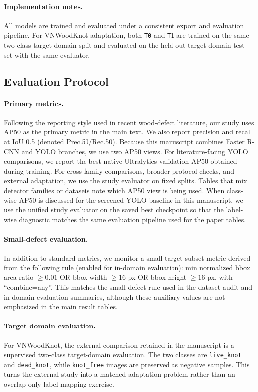 \paragraph{Implementation notes.}
All models are trained and evaluated under a consistent export and evaluation pipeline. For VNWoodKnot adaptation, both \texttt{T0} and \texttt{T1} are trained on the same two-class target-domain split and evaluated on the held-out target-domain test set with the same evaluator.

\subsection{Evaluation Protocol}
\label{sec:eval}

\paragraph{Primary metrics.}
Following the reporting style used in recent wood-defect literature, our study uses AP50 as the primary metric in the main text. We also report precision and recall at IoU 0.5 (denoted Prec.50/Rec.50). Because this manuscript combines Faster R-CNN and YOLO branches, we use two AP50 views. For literature-facing YOLO comparisons, we report the best native Ultralytics validation AP50 obtained during training. For cross-family comparisons, broader-protocol checks, and external adaptation, we use the study evaluator on fixed splits. Tables that mix detector families or datasets note which AP50 view is being used.
When class-wise AP50 is discussed for the screened YOLO baseline in this manuscript, we use the unified study evaluator on the saved best checkpoint so that the label-wise diagnostic matches the same evaluation pipeline used for the paper tables.

\paragraph{Small-defect evaluation.}
In addition to standard metrics, we monitor a small-target subset metric derived from the following rule (enabled for in-domain evaluation):
min normalized bbox area ratio $\ge 0.01$ OR bbox width $\ge 16$ px OR bbox height $\ge 16$ px, with ``combine=any''.
This matches the small-defect rule used in the dataset audit and in-domain evaluation summaries, although these auxiliary values are not emphasized in the main result tables.

\paragraph{Target-domain evaluation.}
For VNWoodKnot, the external comparison retained in the manuscript is a supervised two-class target-domain evaluation. The two classes are \texttt{live\_knot} and \texttt{dead\_knot}, while \texttt{knot\_free} images are preserved as negative samples. This turns the external study into a matched adaptation problem rather than an overlap-only label-mapping exercise.

